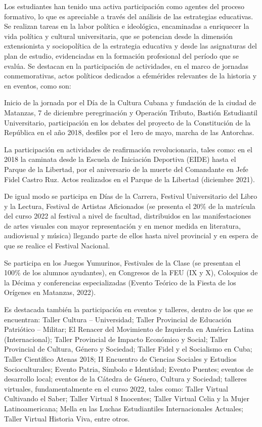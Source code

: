 Los estudiantes han tenido una activa participación como agentes del proceso formativo, lo que es apreciable a través del análisis de las estrategias educativas. Se realizan tareas en la labor política e ideológica, encaminadas a enriquecer la vida política y cultural universitaria, que se potencian desde la dimensión extensionista y sociopolítica de la estrategia educativa y desde las asignaturas del plan de estudio, evidenciadas en la formación profesional del período que se evalúa. Se destacan en la participación de actividades, en el marco de jornadas conmemorativas, actos políticos dedicados a efemérides relevantes de la historia y en eventos, como son:

 Inicio de la jornada por el Día de la Cultura Cubana y fundación de la ciudad de Matanzas, 7 de diciembre peregrinación y Operación Tributo, Bastión Estudiantil Universitario, participación en los debates del proyecto de la Constitución de la República en el año 2018, desfiles por el 1ero de mayo, marcha de las Antorchas. 

 La participación en actividades de reafirmación revolucionaria, tales como: en el 2018 la caminata desde la Escuela de Iniciación Deportiva (EIDE) hasta el Parque de la Libertad, por el aniversario de la muerte del Comandante en Jefe Fidel Castro Ruz. Actos realizados en el Parque de la Libertad (diciembre 2021).

De igual modo se participa en Días de la Carrera, Festival Universitario del Libro y la Lectura, Festival de Artistas Aficionados (se presenta el 20\% de la matrícula del curso 2022 al festival a nivel de facultad, distribuidos en las manifestaciones de artes visuales con mayor representación y en menor medida en literatura, audiovisual y música) llegando parte de ellos hasta nivel provincial y en espera de que se realice el Festival Nacional. 

Se participa en los Juegos Yumurinos, Festivales de la Clase (se presentan el 100\% de los alumnos ayudantes), en Congresos de la FEU (IX y X), Coloquios de la Décima y conferencias especializadas (Evento Teórico de la Fiesta de los Orígenes en Matanzas, 2022).

Es destacada también la participación en eventos y talleres, dentro de los que se encuentran:  Taller Cultura – Universidad; Taller Provincial de Educación Patriótico – Militar;  El Renacer del Movimiento de Izquierda en América Latina (Internacional); Taller Provincial de Impacto Económico y Social; Taller Provincial de Cultura, Género y Sociedad; Taller Fidel y el Socialismo en Cuba; Taller Científico Atenas 2018; II Encuentro de Ciencias Sociales y Estudios Socioculturales; Evento Patria, Símbolo e Identidad; Evento Puentes; eventos de desarrollo local; eventos de la Cátedra de Género, Cultura y Sociedad; talleres virtuales, fundamentalmente en el curso 2022, tales como: Taller Virtual Cultivando el Saber; Taller Virtual 8 Inocentes; Taller Virtual Celia y la Mujer Latinoamericana; Mella en las Luchas Estudiantiles Internacionales Actuales; Taller Virtual Historia Viva, entre otros.

